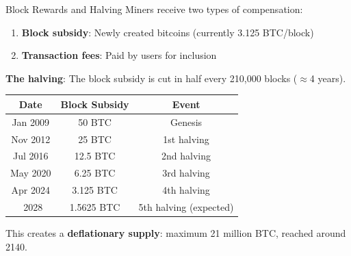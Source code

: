 \documentclass[10pt]{beamer}
\newcommand{\highlight}[1]{\textcolor{AccentOrange}{\textbf{#1}}}
\newcommand{\good}[1]{\textcolor{AccentGreen}{#1}}
\begin{document}
\begin{frame}{Block Rewards and Halving}
  Miners receive two types of compensation:
  
  \vspace{0.5em}
  \begin{enumerate}
    \item \textbf{Block subsidy}: Newly created bitcoins (currently 3.125 BTC/block)
    \item \textbf{Transaction fees}: Paid by users for inclusion
  \end{enumerate}
  
  \vspace{1em}
  \textbf{The halving}: The block subsidy is cut in half every 210,000 blocks ($\approx$4 years).
  
  \vspace{0.5em}
  \begin{center}
  \begin{tabular}{ccc}
    \toprule
    \textbf{Date} & \textbf{Block Subsidy} & \textbf{Event} \\
    \midrule
    Jan 2009 & 50 BTC & Genesis \\
    Nov 2012 & 25 BTC & 1st halving \\
    Jul 2016 & 12.5 BTC & 2nd halving \\
    May 2020 & 6.25 BTC & 3rd halving \\
    \good{Apr 2024} & \good{3.125 BTC} & \good{4th halving} \\
    ~2028 & 1.5625 BTC & 5th halving (expected) \\
    \bottomrule
  \end{tabular}
  \end{center}
  
  \vspace{0.5em}
  This creates a \highlight{deflationary supply}: maximum 21 million BTC, reached around 2140.
\end{frame}
\end{document}
